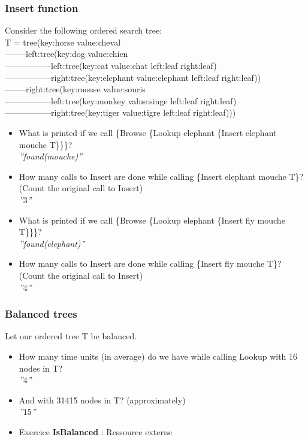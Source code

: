 \documentclass[fr,license=none]{../../../eplsummary}
\begin{document}
			\subsubsection*{Insert function}
				Consider the following ordered search tree:\\
				T = tree(key:horse value:cheval\\
				--------left:tree(key:dog value:chien\\
				-----------------left:tree(key:cat value:chat left:leaf right:leaf)\\
				-----------------right:tree(key:elephant value:elephant left:leaf right:leaf))\\
				--------right:tree(key:mouse value:souris\\
				-----------------left:tree(key:monkey value:singe left:leaf right:leaf)\\
				-----------------right:tree(key:tiger value:tigre left:leaf right:leaf)))
				\begin{itemize}
					\item What is printed if we call \{Browse \{Lookup elephant \{Insert elephant mouche T\}\}\}?\\
						\textit{''found(mouche)''}
					\item How many calls to Insert are done while calling \{Insert elephant mouche T\}? (Count the original call to Insert)\\
						\textit{''$3$''}
					\item What is printed if we call \{Browse \{Lookup elephant \{Insert fly mouche T\}\}\}?\\
						\textit{''found(elephant)''}
					\item How many calls to Insert are done while calling \{Insert fly mouche T\}? (Count the original call to Insert)\\
						\textit{''$4$''}
				\end{itemize}
			\subsubsection*{Balanced trees}
				Let our ordered tree T be balanced.
				\begin{itemize}
					\item How many time units (in average) do we have while calling Lookup with 16 nodes in T?\\
						\textit{''$4$''}
					\item And with 31415 nodes in T? (approximately)\\
						\textit{''$15$''}
					\item Exercice \textbf{IsBalanced} : Ressource externe\\
						
						
				\end{itemize}
\end{document}
